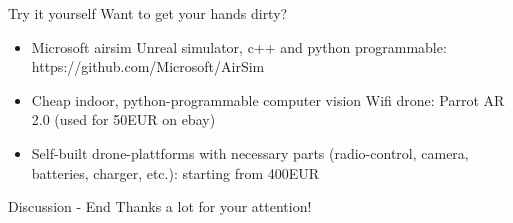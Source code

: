 \documentclass[aspectratio=169]{beamer}
\begin{document}
\begin{frame}{Try it yourself}
	Want to get your hands dirty?
	\begin{itemize}
		\item Microsoft airsim Unreal simulator, c++ and python programmable: https://github.com/Microsoft/AirSim	
		\item Cheap indoor, python-programmable computer vision Wifi drone: Parrot AR 2.0 (used for 50EUR on ebay)
		\item Self-built drone-plattforms with necessary parts (radio-control, camera, batteries, charger, etc.): starting from 400EUR
	\end{itemize}
\end{frame}

\begin{frame}{Discussion - End}
	\center
	\huge{Thanks a lot for your attention!}
\end{frame}
\end{document}
